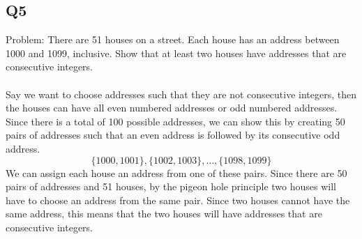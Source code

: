 \documentclass[12pt, oneside]{article}
\begin{document}
\subsection*{Q5}
Problem: There are 51 houses on a street. Each house has an address
between 1000 and 1099, inclusive. Show that at least two
houses have addresses that are consecutive integers. 
\\\\
Say we want to choose addresses such that they are not consecutive integers, then the houses can have all even numbered addresses or odd numbered addresses. Since there is a total of 100 possible addresses, we can show this by creating 50 pairs of addresses such that an even address is followed by its consecutive odd address.
\[\{1000,1001\},\{1002,1003\},...,\{1098,1099\}  \]
We can assign each house an address from one of these pairs. Since there are 50 pairs of addresses and 51 houses, by the pigeon hole principle two houses will have to choose an address from the same pair. Since two houses cannot have the same address, this means that the two houses will have addresses that are consecutive integers.
\end{document}
